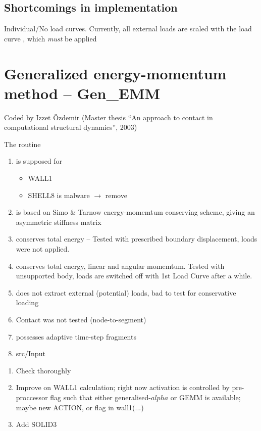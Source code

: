 \subsection{Shortcomings in \ccarat{} implementation}
Individual/No load curves. Currently, all external loads are scaled with
  the load curve , which \emph{must} be applied


\section{Generalized energy-momentum method -- \ccarat{} Gen\_EMM}
Coded by Izzet \"{O}zdemir (Master thesis ``An approach to contact in
computational structural dynamics'', 2003)

The routine
\begin{enumerate}
\item is supposed for
  \begin{itemize}
  \item WALL1
  \item SHELL8 is malware $\to$ remove
  \end{itemize}
\item is based on Simo \& Tarnow energy-momemtum conserving scheme, giving
  an asymmetric stiffness matrix 
\item conserves total energy -- Tested with
  prescribed boundary displacement, loads were not applied.
\item conserves total energy, linear and angular momemtum. Tested with
  unsupported body, loads are switched off with 1st Load Curve after a while. 
\item does not extract external (potential) loads, bad to test for
  conservative loading 
\item Contact was not tested (node-to-segment)
\item possesses adaptive time-step fragments
\item src/Input 
\end{enumerate}

\begin{enumerate}
\item Check thoroughly
\item Improve on WALL1 calculation; right now activation is controlled by
  pre-proccessor flag such that either generalised-$alpha$ or GEMM is
  available; maybe new ACTION, or flag in wall1(...)
\item Add SOLID3
\end{enumerate}

